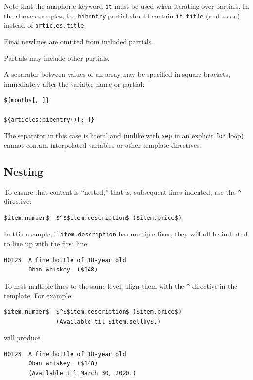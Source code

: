 \documentclass[
  b5paper
]{book}
\begin{document}
Note that the anaphoric keyword \texttt{it} must be used when iterating
over partials. In the above examples, the \texttt{bibentry} partial
should contain \texttt{it.title} (and so on) instead of
\texttt{articles.title}.

Final newlines are omitted from included partials.

Partials may include other partials.

A separator between values of an array may be specified in square
brackets, immediately after the variable name or partial:

\begin{verbatim}
${months[, ]}

${articles:bibentry()[; ]}
\end{verbatim}

The separator in this case is literal and (unlike with \texttt{sep} in
an explicit \texttt{for} loop) cannot contain interpolated variables or
other template directives.

\subsection{Nesting}\label{nesting}

To ensure that content is ``nested,'' that is, subsequent lines
indented, use the \texttt{\^{}} directive:

\begin{verbatim}
$item.number$  $^$$item.description$ ($item.price$)
\end{verbatim}

In this example, if \texttt{item.description} has multiple lines, they
will all be indented to line up with the first line:

\begin{verbatim}
00123  A fine bottle of 18-year old
       Oban whiskey. ($148)
\end{verbatim}

To nest multiple lines to the same level, align them with the
\texttt{\^{}} directive in the template. For example:

\begin{verbatim}
$item.number$  $^$$item.description$ ($item.price$)
               (Available til $item.sellby$.)
\end{verbatim}

will produce

\begin{verbatim}
00123  A fine bottle of 18-year old
       Oban whiskey. ($148)
       (Available til March 30, 2020.)
\end{verbatim}
\end{document}
